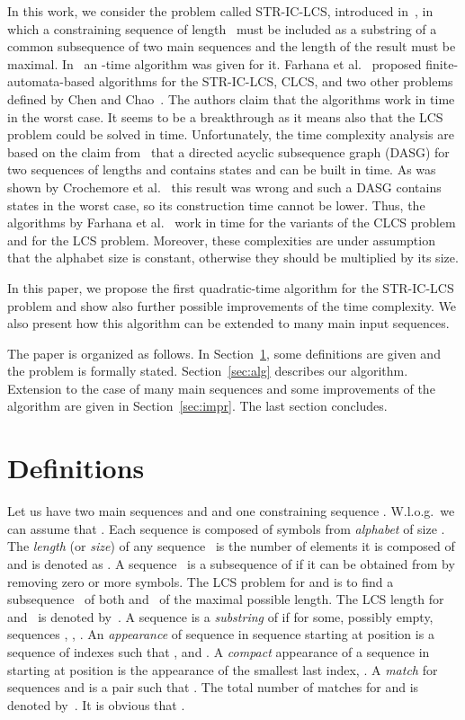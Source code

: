 \documentclass[12pt]{article}
\begin{document}
In this work, we consider the problem called STR-IC-LCS, introduced in~\cite{CC2011}, in which a constraining sequence of length~ must be included as a substring of a common subsequence of two main sequences and the length of the result must be maximal.
In~\cite{CC2011} an -time algorithm was given for it.
Farhana et al.~\cite{FFMR2010} proposed finite-automata-based algorithms for the STR-IC-LCS, CLCS, and two other problems defined by Chen and Chao~\cite{CC2011}.
The authors claim that the algorithms work in  time in the worst case.
It seems to be a breakthrough as it means also that the LCS problem could be solved in  time.
Unfortunately, the time complexity analysis are based on the claim from~\cite{BY1991} that a directed acyclic subsequence graph (DASG) for two sequences of lengths  and  contains  states and can be built in  time.
As was shown by Crochemore et al.~\cite{CMT2003} this result was wrong and such a DASG contains  states in the worst case, so its construction time cannot be lower.
Thus, the algorithms by Farhana et al.~\cite{FFMR2010} work in  time for the variants of the CLCS problem and  for the LCS problem.
Moreover, these complexities are under assumption that the alphabet size is constant, otherwise they should be multiplied by its size.




In this paper, we propose the first quadratic-time algorithm for the STR-IC-LCS problem and show also further possible improvements of the time complexity.
We also present how this algorithm can be extended to many main input sequences.

The paper is organized as follows.
In Section~\ref{sec:defs}, some definitions are given and the problem is formally stated.
Section~\ref{sec:alg} describes our algorithm.
Extension to the case of many main sequences and some improvements of the algorithm are given in Section~\ref{sec:impr}.
The last section concludes.


\section{Definitions}
\label{sec:defs}
Let us have two main sequences  and  and one constraining sequence .
W.l.o.g.\ we can assume that .
Each sequence is composed of symbols from \emph{alphabet}  of size .
The \emph{length} (or \emph{size}) of any sequence~ is the number of elements it is composed of and is denoted as .
A sequence~ is a subsequence of  if it can be obtained from  by removing zero or more symbols.
The LCS problem for  and  is to find a subsequence~ of both  and~ of the maximal possible length.
The LCS length for  and~ is denoted by~.
A sequence  is a \emph{substring} of  if  for some, possibly empty, sequences , , .
An \emph{appearance} of sequence  in sequence  starting at position  is a sequence of indexes  such that , and .
A \emph{compact} appearance of a sequence  in  starting at position  is the appearance of the smallest last index, .
A \emph{match} for sequences  and  is a pair  such that .
The total number of matches for  and  is denoted by~.
It is obvious that .
\end{document}
